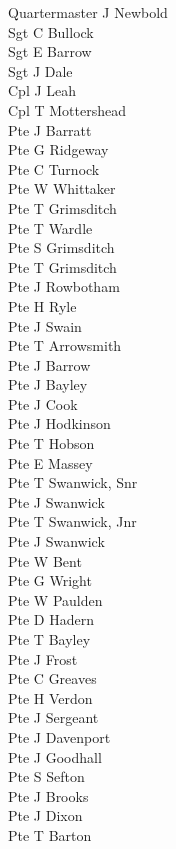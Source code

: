 \begin{multicols}{2}
  \small
  \noindent
  Quartermaster J Newbold \\
  Sgt C Bullock \\
  Sgt E Barrow \\
  Sgt J Dale \\
  Cpl J Leah \\
  Cpl T Mottershead \\
  Pte J Barratt \\
  Pte G Ridgeway \\
  Pte C Turnock \\
  Pte W Whittaker \\
  Pte T Grimsditch \\
  Pte T Wardle \\
  Pte S Grimsditch \\
  Pte T Grimsditch \\
  Pte J Rowbotham \\
  Pte H Ryle \\
  Pte J Swain \\
  Pte T Arrowsmith \\
  Pte J Barrow \\
  Pte J Bayley \\
  Pte J Cook \\
  Pte J Hodkinson \\
  Pte T Hobson \\
  Pte E Massey \\
  Pte T Swanwick, Snr \\
  Pte J Swanwick \\
  Pte T Swanwick, Jnr \\
  Pte J Swanwick \\
  Pte W Bent \\
  Pte G Wright \\
  Pte W Paulden \\
  Pte D Hadern \\
  Pte T Bayley \\
  Pte J Frost \\
  Pte C Greaves \\
  Pte H Verdon \\
  Pte J Sergeant \\
  Pte J Davenport \\
  Pte J Goodhall \\
  Pte S Sefton \\
  Pte J Brooks \\
  Pte J Dixon \\
  Pte T Barton \\

\end{multicols}
